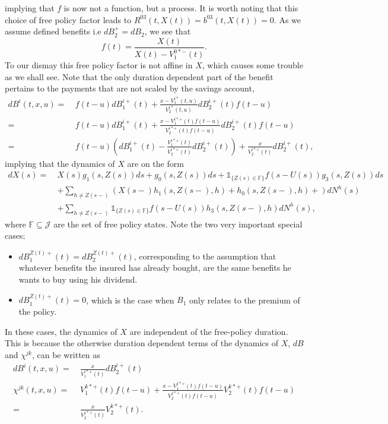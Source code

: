 \documentclass[12pt]{article}
\newcommand{\indic}[1]{\mathds{1}_{ \{ #1 \} }}
\theoremstyle{my_thm}
\theoremstyle{my_rem}
\begin{document}
implying that $f$ is now not a function, but a process. It is worth noting that this choice of free policy factor leads to $R^{03}(t,X(t))=b^{03}(t,X(t))=0$. As we assume defined benefits i.e $dB_2^+=dB_2$, we see that
$$
f(t)=\frac{X(t)}{X(t)-V_1^{0*-}(t)}.
$$
To our dismay this free policy factor is not affine in $X$, which causes some trouble as we shall see. Note that the only duration dependent part of the benefit pertains to the payments that are not scaled by the savings account,
\begin{align*}
dB^i(t,x,u)= \ &f(t-u)dB^{i+}_1(t)+\frac{x-V_1^{i*}(t,u)}{V_2^{i*}(t,u)}dB_2^{i+}(t)f(t-u)
\\
= \ &
f(t-u)dB^{i+}_1(t)+\frac{x-V_1^{i*+}(t)f(t-u)}{V_2^{i*+}(t)f(t-u)}dB_2^{i+}(t)f(t-u)
\\
= \ &
f(t-u)\left( dB^{i+}_1(t) - \frac{V_1^{i*+}(t)}{V_2^{i*+}(t)}dB_2^{i+}(t) \right)  +\frac{x}{V_2^{i*+}(t)}dB_2^{i+}(t),
\end{align*}
implying that the dynamics of $X$ are on the form
\begin{align}
dX(s)= \ &X(s)g_1(s,Z(s))ds+g_0(s,Z(s))ds +  \indic{Z(s)\in \mathbb{F}} f(s-U(s)) g_3(s,Z(s))ds \label{eq:AAK} \\
&+
\sum_{h\neq Z(s-)} \left( X(s-)h_1(s,Z(s-),h)+ h_0(s,Z(s-),h) + \right) dN^h(s)
\nonumber \\
&+
\sum_{h\neq Z(s-)}  \indic{Z(s)\in \mathbb{F}} f(s-U(s))h_3(s,Z(s-),h) dN^h(s),
\nonumber
\end{align}
where $\mathbb{F} \subseteq \mathcal{J}$ are the set of free policy states. Note the two very important special cases;
\begin{itemize}
\item $dB_1^{Z(t)+}(t)=dB_2^{Z(t)+}(t)$, corresponding to the assumption that whatever benefits the insured has already bought, are the same benefits he wants to buy using his dividend.
\item $dB_1^{Z(t)+}(t)=0$, which is the case when $B_1$ only relates to the premium of the policy. 
\end{itemize}  In these cases, the dynamics of $X$ are independent of the free-policy duration. This is because the otherwise duration dependent terms of the dynamics of $X$, $dB$ and $\chi^{jk}$, can be written as
\begin{align*}
dB^i(t,x,u)= \ &\frac{x}{V_1^{i*+}(t)}dB_2^{i+}(t)
\\
\chi^{jk}(t,x,u)= \ &V_1^{k*+}(t)f(t-u)+\frac{x-V_1^{j*+}(t)f(t-u)}{V_2^{j*+}(t)f(t-u)}V_2^{k*+}(t)f(t-u)
\\
= \ &
\frac{x}{V_2^{j*+}(t)}V_2^{k*+}(t).
\end{align*}
\end{document}
